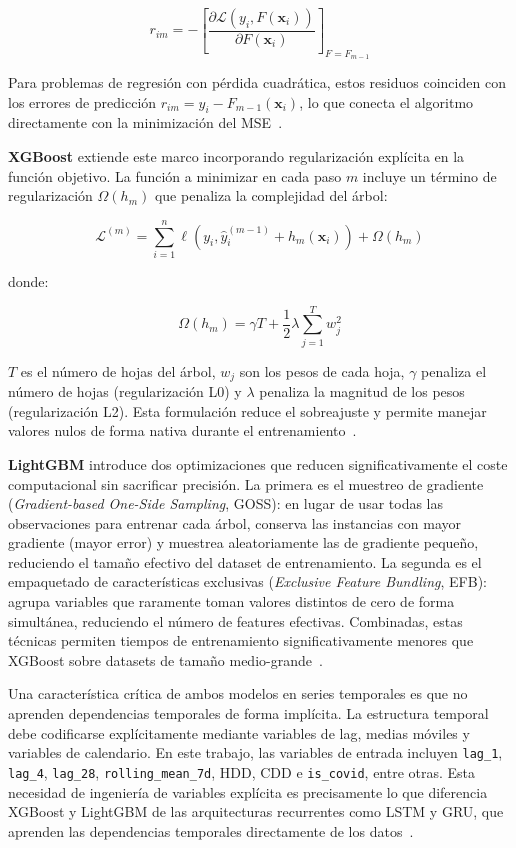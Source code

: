 \documentclass[12pt, a4paper]{article}
\begin{document}
\begin{equation}
r_{im} = -\left[\frac{\partial \mathcal{L}(y_i, F(\mathbf{x}_i))}{\partial F(\mathbf{x}_i)}\right]_{F=F_{m-1}}
\end{equation}

Para problemas de regresión con pérdida cuadrática, estos residuos coinciden con los errores de predicción $r_{im} = y_i - F_{m-1}(\mathbf{x}_i)$, lo que conecta el algoritmo directamente con la minimización del MSE~\cite{chen2016}.

\textbf{XGBoost} extiende este marco incorporando regularización explícita en la función objetivo. La función a minimizar en cada paso $m$ incluye un término de regularización $\Omega(h_m)$ que penaliza la complejidad del árbol:

\begin{equation}
\mathcal{L}^{(m)} = \sum_{i=1}^{n} \ell(y_i, \hat{y}_i^{(m-1)} + h_m(\mathbf{x}_i)) + \Omega(h_m)
\end{equation}

donde:

\begin{equation}
\Omega(h_m) = \gamma T + \frac{1}{2}\lambda \sum_{j=1}^{T} w_j^2
\end{equation}

$T$ es el número de hojas del árbol, $w_j$ son los pesos de cada hoja, $\gamma$ penaliza el número de hojas (regularización L0) y $\lambda$ penaliza la magnitud de los pesos (regularización L2). Esta formulación reduce el sobreajuste y permite manejar valores nulos de forma nativa durante el entrenamiento~\cite{chen2016}.

\textbf{LightGBM} introduce dos optimizaciones que reducen significativamente el coste computacional sin sacrificar precisión. La primera es el muestreo de gradiente (\textit{Gradient-based One-Side Sampling}, GOSS): en lugar de usar todas las observaciones para entrenar cada árbol, conserva las instancias con mayor gradiente (mayor error) y muestrea aleatoriamente las de gradiente pequeño, reduciendo el tamaño efectivo del dataset de entrenamiento. La segunda es el empaquetado de características exclusivas (\textit{Exclusive Feature Bundling}, EFB): agrupa variables que raramente toman valores distintos de cero de forma simultánea, reduciendo el número de features efectivas. Combinadas, estas técnicas permiten tiempos de entrenamiento significativamente menores que XGBoost sobre datasets de tamaño medio-grande~\cite{ke2017}.

Una característica crítica de ambos modelos en series temporales es que no aprenden dependencias temporales de forma implícita. La estructura temporal debe codificarse explícitamente mediante variables de lag, medias móviles y variables de calendario. En este trabajo, las variables de entrada incluyen \texttt{lag\_1}, \texttt{lag\_4}, \texttt{lag\_28}, \texttt{rolling\_mean\_7d}, HDD, CDD e \texttt{is\_covid}, entre otras. Esta necesidad de ingeniería de variables explícita es precisamente lo que diferencia XGBoost y LightGBM de las arquitecturas recurrentes como LSTM y GRU, que aprenden las dependencias temporales directamente de los datos~\cite{jiang2024, chen2016, ke2017}.
\end{document}
